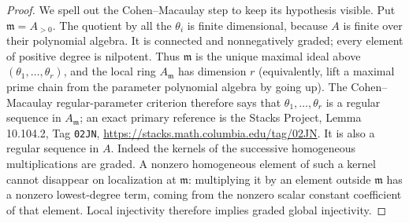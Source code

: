 \documentclass[11pt,a4paper]{article}
\begin{document}
\begin{proof}
We spell out the Cohen--Macaulay step to keep its hypothesis visible.
Put $\mathfrak m=A_{>0}$. The quotient by all the $\theta_i$ is
finite dimensional, because $A$ is finite over their polynomial
algebra. It is connected and nonnegatively graded; every element of
positive degree is nilpotent. Thus $\mathfrak m$ is the unique maximal
ideal above $(\theta_1,\ldots,\theta_r)$, and the local ring
$A_{\mathfrak m}$ has dimension $r$ (equivalently, lift a maximal
prime chain from the parameter polynomial algebra by going up).
The Cohen--Macaulay regular-parameter criterion therefore says that
$\theta_1,\ldots,\theta_r$ is a regular sequence in $A_{\mathfrak m}$;
an exact primary reference is the Stacks Project,
Lemma 10.104.2, Tag \texttt{02JN},
\url{https://stacks.math.columbia.edu/tag/02JN}.
It is also a regular sequence in $A$. Indeed the kernels of the
successive homogeneous multiplications are graded. A nonzero
homogeneous element of such a kernel cannot disappear on localization
at $\mathfrak m$: multiplying it by an element outside $\mathfrak m$
has a nonzero lowest-degree term, coming from the nonzero scalar
constant coefficient of that element. Local injectivity therefore
implies graded global injectivity.


\end{proof}
\end{document}

